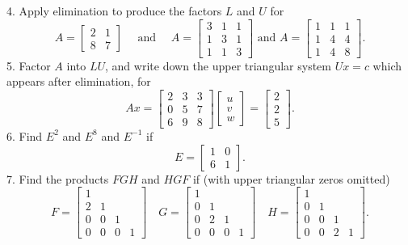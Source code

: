 

4. Apply elimination to produce the factors $L$ and $U$ for
$$
A=\left[\begin{array}{ll}
2 & 1 \\
8 & 7
\end{array}\right] \quad \text { and } \quad A=\left[\begin{array}{lll}
3 & 1 & 1 \\
1 & 3 & 1 \\
1 & 1 & 3
\end{array}\right] \text { and } A=\left[\begin{array}{lll}
1 & 1 & 1 \\
1 & 4 & 4 \\
1 & 4 & 8
\end{array}\right] .
$$
5. Factor $A$ into $L U$, and write down the upper triangular system $U x=c$ which appears after elimination, for
$$
A x=\left[\begin{array}{lll}
2 & 3 & 3 \\
0 & 5 & 7 \\
6 & 9 & 8
\end{array}\right]\left[\begin{array}{l}
u \\
v \\
w
\end{array}\right]=\left[\begin{array}{l}
2 \\
2 \\
5
\end{array}\right] .
$$
6. Find $E^2$ and $E^8$ and $E^{-1}$ if
$$
E=\left[\begin{array}{ll}
1 & 0 \\
6 & 1
\end{array}\right] .
$$
7. Find the products $F G H$ and $H G F$ if (with upper triangular zeros omitted)
$$
F=\left[\begin{array}{llll}
1 & & & \\
2 & 1 & & \\
0 & 0 & 1 & \\
0 & 0 & 0 & 1
\end{array}\right] \quad G=\left[\begin{array}{llll}
1 & & & \\
0 & 1 & & \\
0 & 2 & 1 & \\
0 & 0 & 0 & 1
\end{array}\right] \quad H=\left[\begin{array}{llll}
1 & & & \\
0 & 1 & & \\
0 & 0 & 1 & \\
0 & 0 & 2 & 1
\end{array}\right] .
$$
